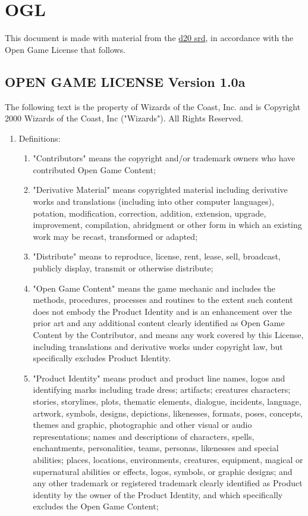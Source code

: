 \section{OGL}
This document is made with material from the \href{http://www.wizards.com/default.asp?x=d20/article/srd35}{d20 srd},
in accordance with the Open Game License that follows.
\subsection{OPEN GAME LICENSE Version 1.0a}
\label{sec:OGL}
\small
The following text is the property of Wizards of the Coast, Inc. and is Copyright 2000 Wizards of the Coast, Inc ("Wizards"). All Rights Reserved.

\begin{enumerate}\item Definitions: 
\begin{enumerate}
 \item "Contributors" means the copyright and/or trademark owners who have contributed Open Game Content;
 \item "Derivative Material" means copyrighted material including derivative works and translations (including into other computer languages), potation, modification, correction, addition, extension, upgrade, improvement, compilation, abridgment or other form in which an existing work may be recast, transformed or adapted;
 \item "Distribute" means to reproduce, license, rent, lease, sell, broadcast, publicly display, transmit or otherwise distribute; 
 \item "Open Game Content" means the game mechanic and includes the methods, procedures, processes and routines to the extent such content does not embody the Product Identity and is an enhancement over the prior art and any additional content clearly identified as Open Game Content by the Contributor, and means any work covered by this License, including translations and derivative works under copyright law, but specifically excludes Product Identity.
 \item "Product Identity" means product and product line names, logos and identifying marks including trade dress; artifacts; creatures characters; stories, storylines, plots, thematic elements, dialogue, incidents, language, artwork, symbols, designs, depictions, likenesses, formats, poses, concepts, themes and graphic, photographic and other visual or audio representations; names and descriptions of characters, spells, enchantments, personalities, teams, personas, likenesses and special abilities; places, locations, environments, creatures, equipment, magical or supernatural abilities or effects, logos, symbols, or graphic designs; and any other trademark or registered trademark clearly identified as Product identity by the owner of the Product Identity, and which specifically excludes the Open Game Content;

\end{enumerate}
\end{enumerate}

